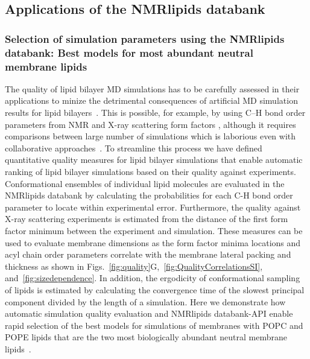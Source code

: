 \documentclass[fleqn,10pt]{wlscirep}
\begin{document}
\subsection{Applications of the NMRlipids databank}
\subsubsection{Selection of simulation parameters using the NMRlipids databank: Best models for most abundant neutral membrane lipids}
%
%
The quality of lipid bilayer MD simulations has to be carefully assessed in their applications to minize the detrimental consequences of artificial MD simulation results for lipid bilayers~\cite{antila22b}. This is possible, for example, by using C--H bond order parameters from NMR and X-ray scattering form factors \cite{ollila16}, although it requires comparisons between large number of simulations which is laborious even with collaborative approaches~\cite{botan15,catte16,antila19,bacle21}. To streamline this process we have defined quantitative quality measures for lipid bilayer simulations that enable automatic ranking of lipid bilayer simulations based on their quality against experiments. Conformational ensembles of individual lipid molecules are evaluated in the NMRlipids databank by calculating the probabilities for each C-H bond order parameter to locate within experimental error. Furthermore, the quality against X-ray scattering experiments is estimated from the distance of the first form factor minimum between the experiment and simulation. These measures can be used to evaluate membrane dimensions as the form factor minima locations and acyl chain order parameters correlate with the membrane lateral packing and thickness as shown in Figs.~\ref{fig:quality}G,~\ref{fig:QualityCorrelationsSI}, and~\ref{fig:sizedependence}. In addition, the ergodicity of conformational sampling of lipids is estimated by calculating the convergence time of the slowest principal component divided by the length of a simulation. Here we demonstrate how automatic simulation quality evaluation and NMRlipids databank-API enable rapid selection of the best models for simulations of membranes with POPC and POPE lipids that are the two most biologically abundant neutral membrane lipids~\cite{vanmeer08}.
\end{document}
